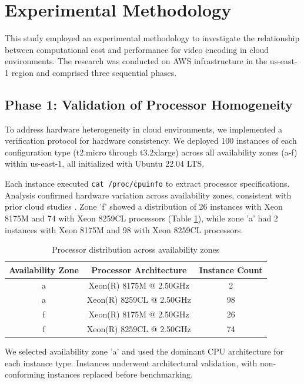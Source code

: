 \documentclass[conference]{IEEEtran}
\begin{document}
	\section{Experimental Methodology}
	\label{met}
	
	This study employed an experimental methodology to investigate the relationship between computational cost and performance for video encoding in cloud environments. The research was conducted on AWS infrastructure in the us-east-1 region and comprised three sequential phases.
	
	\subsection{Phase 1: Validation of Processor Homogeneity}
	\label{met:validation-processor-homogeneity}
	
	To address hardware heterogeneity in cloud environments, we implemented a verification protocol for hardware consistency. We deployed 100 instances of each configuration type (t2.micro through t3.2xlarge) across all availability zones (a-f) within us-east-1, all initialized with Ubuntu 22.04 LTS.
	
	Each instance executed \texttt{cat /proc/cpuinfo} to extract processor specifications. Analysis confirmed hardware variation across availability zones, consistent with prior cloud studies \cite{b2, b5, b6, b7}. Zone 'f' showed a distribution of 26 instances with Xeon 8175M and 74 with Xeon 8259CL processors (Table \ref{tab:processors}), while zone 'a' had 2 instances with Xeon 8175M and 98 with Xeon 8259CL processors.
	
	\begin{table}[H]
		\centering
		\caption{Processor distribution across availability zones}
		\label{tab:processors}
		\begin{tabular}{|c|c|c|}
			\hline
			Availability Zone & Processor Architecture & Instance Count \\ \hline
			a & Xeon(R) 8175M @ 2.50GHz & 2 \\ \hline
			a & Xeon(R) 8259CL @ 2.50GHz & 98 \\ \hline
			f & Xeon(R) 8175M @ 2.50GHz & 26 \\ \hline
			f & Xeon(R) 8259CL @ 2.50GHz & 74 \\ \hline
		\end{tabular}
	\end{table}
	
	We selected availability zone 'a' and used the dominant CPU architecture for each instance type. Instances underwent architectural validation, with non-conforming instances replaced before benchmarking.
	
\end{document}
